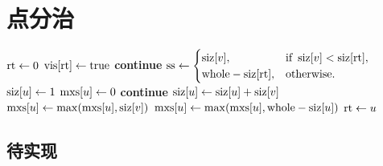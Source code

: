 \section{点分治}\label{sec:point-divide}

\begin{algorithm}[H]
    \caption{点分治}
    \begin{algorithmic}[1]
            \State {}
        \EndProcedure
            \State $\pvar{rt} \gets 0$
            \State {}
            \State $\pvar{vis}[\pvar{rt}] \gets \mathrm{true}$
            \State {}
                    \State \textbf{continue}
                \EndIf
                \State $\pvar{ss} \gets \begin{cases} \pvar{siz}[v], & \text{if }\,\pvar{siz}[v] < \pvar{siz}[\pvar{rt}], \\ \pvar{whole} - \pvar{siz}[\pvar{rt}], & \text{otherwise}. \end{cases}$
                \State {}
            \EndFor
        \EndProcedure
            \State $\pvar{siz}[u] \gets 1$
            \State $\pvar{mxs}[u] \gets 0$
                    \State \textbf{continue}
                \EndIf
                \State {}
                \State $\pvar{siz}[u] \gets \pvar{siz}[u] + \pvar{siz}[v]$
                \State $\pvar{mxs}[u] \gets \max(\pvar{mxs}[u], \pvar{siz}[v])$
            \EndFor
            \State $\pvar{mxs}[u] \gets \max(\pvar{mxs}[u], \pvar{whole} - \pvar{siz}[u])$
                \State $\pvar{rt} \gets u$
            \EndIf
        \EndProcedure
            \State {}
        \EndProcedure
    \end{algorithmic}
\end{algorithm}

\subsection{待实现}


